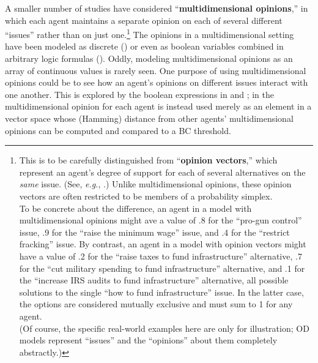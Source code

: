 A smaller number of studies have considered ``\textbf{multidimensional
opinions},'' in which each agent maintains a separate opinion on each of
several different ``issues'' rather than on just one.\footnote{This is to be
carefully distinguished from ``\textbf{opinion vectors},'' which represent an
agent's degree of support for each of several alternatives on the \textit{same}
issue. (See, \textit{e.g.}, \cite{sirbu_opinion_2013}.) Unlike multidimensional
opinions, these opinion vectors are often restricted to be members of a
probability simplex.\\\indent To be concrete about the difference, an agent in
a model with multidimensional opinions might ave a value of .8 for the
``pro-gun control'' issue, .9 for the ``raise the minimum wage'' issue, and .4
for the ``restrict fracking'' issue. By contrast, an agent in a model with
opinion vectors might have a value of .2 for the ``raise taxes to fund
infrastructure'' alternative, .7 for the ``cut military spending to fund
infrastructure'' alternative, and .1 for the ``increase IRS audits to fund
infrastructure'' alternative, all possible solutions to the single ``how to
fund infrastructure'' issue. In the latter case, the options are considered
mutually exclusive and must sum to 1 for any agent.\\\indent (Of course, the
specific real-world examples here are only for illustration; OD models
represent ``issues'' and the ``opinions'' about them completely abstractly.)}
The opinions in a multidimensional setting have been modeled as discrete
(\cite{deffuant_mixing_2000}) or even as boolean variables combined in
arbitrary logic formulas (\cite{van_den_herik_modelling_2019,
cholvy_diffusion_2016}). Oddly, modeling multidimensional opinions as an array
of continuous values is rarely seen. One purpose of using multidimensional
opinions could be to see how an agent's opinions on different issues interact
with one another. This is explored by the boolean expressions in
\cite{van_den_herik_modelling_2019} and \cite{cholvy_diffusion_2016}; in
\cite{deffuant_mixing_2000} the multidimensional opinion for each agent is
instead used merely as an element in a vector space whose (Hamming) distance
from other agents' multidimensional opinions can be computed and compared to a
BC threshold.

